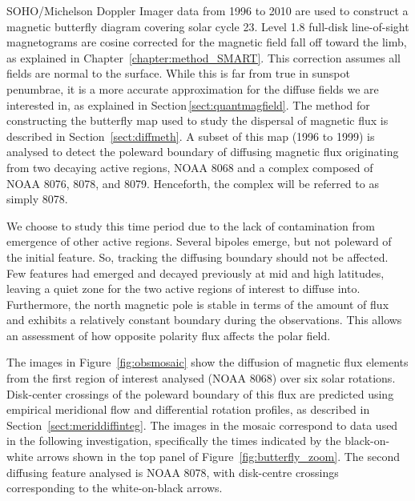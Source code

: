 \gls{SOHO}/Michelson Doppler Imager \citep[MDI;][]{Scherrer:1995} data from 1996 to 2010 are used to construct a magnetic butterfly diagram covering solar cycle 23. Level 1.8 full-disk line-of-sight magnetograms are cosine corrected for the magnetic field fall off toward the limb, as explained in Chapter~\ref{chapter:method_SMART}. This correction assumes all fields are normal to the surface. While this is far from true in sunspot penumbrae, it is a more accurate approximation for the diffuse fields we are interested in, as explained in Section\,\ref{sect:quantmagfield}. 
The method for constructing the butterfly map used to study the dispersal of magnetic flux is described in Section~\ref{sect:diffmeth}. A subset of this map (1996 to 1999) is analysed to detect the poleward boundary of diffusing magnetic flux originating from two decaying active regions, \gls{NOAA} 8068 and a complex composed of \gls{NOAA} 8076, 8078, and 8079. Henceforth, the complex will be referred to as simply 8078. 

We choose to study this time period due to the lack of contamination from emergence of other active regions. Several bipoles emerge, but not poleward of the initial feature. So, tracking the diffusing boundary should not be affected. Few features had emerged and decayed previously at mid and high latitudes, leaving a quiet zone for the two active regions of interest to diffuse into. Furthermore, the north magnetic pole is stable in terms of the amount of flux and exhibits a relatively constant boundary during the observations. This allows an assessment of how opposite polarity flux affects the polar field. 

The images in Figure~\ref{fig:obsmosaic} show the diffusion of magnetic flux elements from the first region of interest analysed (NOAA 8068) over six solar rotations. Disk-center crossings of the poleward boundary of this flux are predicted using empirical meridional flow and differential rotation profiles, as described in Section~\ref{sect:meriddiffinteg}. 
The images in the mosaic correspond to data used in the following investigation, specifically the times indicated by the black-on-white arrows shown in the top panel of Figure~\ref{fig:butterfly_zoom}. The second diffusing feature analysed is NOAA 8078, with disk-centre crossings corresponding to the white-on-black arrows. %


